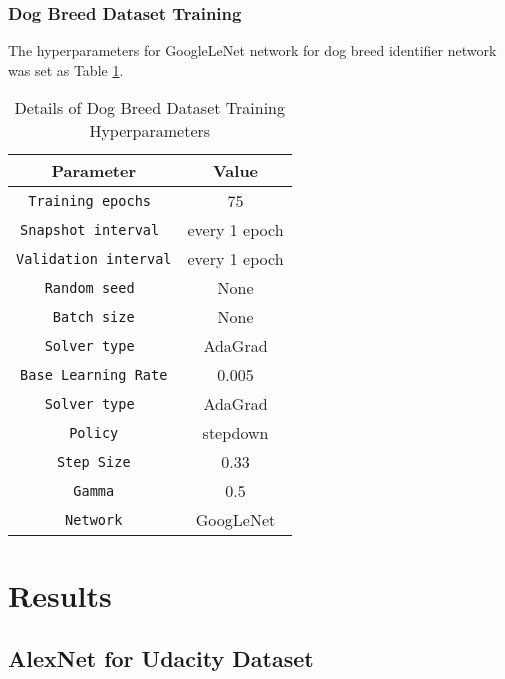 \documentclass[10pt,journal,compsoc]{IEEEtran}
\begin{document}
\subsubsection{Dog Breed Dataset Training}
The hyperparameters for GoogleLeNet network for dog breed identifier network was set as Table \ref{table:Dog Breed Dataset Training Hyperparameters}.
\begin{table}[ht]
      \caption{Details of Dog Breed Dataset Training Hyperparameters }
      \label{table:Dog Breed Dataset Training Hyperparameters}
      \begin{center}
      \begin{tabular}{|c|c|}
      \hline
      Parameter & Value \\
      \hline\hline
      \verb!Training epochs ! & 75\\
      \hline
      \verb!Snapshot interval ! & every 1 epoch\\
      \hline
      \verb!Validation interval! & every 1 epoch\\
      \hline
      \verb!Random seed ! & None\\
      \hline
      \verb!Batch size! & None\\
      \hline
      \verb!Solver type ! & AdaGrad\\
      \hline
      \verb!Base Learning Rate! & 0.005\\
      \hline
      \verb!Solver type ! & AdaGrad\\
      \hline
      \verb!Policy! & stepdown\\
      \hline
      \verb!Step Size! & 0.33\\
      \hline
      \verb!Gamma! & 0.5\\
      \hline
      \verb!Network! & GoogLeNet \cite{Szegedy2014}\\
      \hline
      \end{tabular}
      \end{center}
\end{table}

\section{Results}
\subsection{AlexNet for Udacity Dataset}
\end{document}
